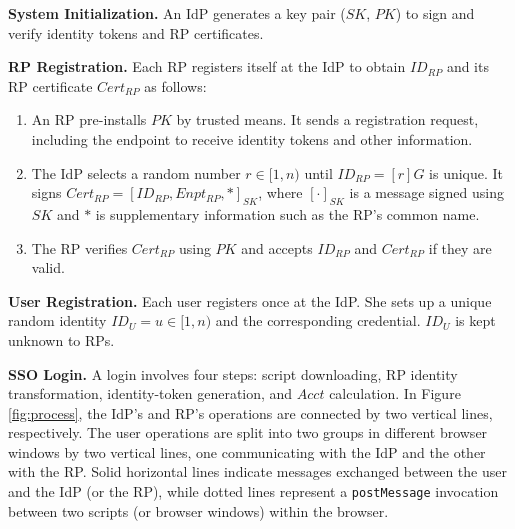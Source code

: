 \noindent \textbf{System Initialization.}
An IdP generates a key pair ($SK$, $PK$) to sign and verify identity tokens and RP certificates.

\vspace{1.5mm}
\noindent\textbf{RP Registration.}
Each RP registers itself at the IdP to obtain $ID_{RP}$ and its RP certificate $Cert_{RP}$ as follows:
\vspace{-\topsep}\begin{enumerate}
\setlength{\topsep}{0pt}
\setlength{\partopsep}{0pt}
\setlength{\itemsep}{0pt}
\setlength{\parsep}{0pt}
\setlength{\parskip}{0pt}
\item
An RP pre-installs $PK$ by trusted means.
It sends a registration request, including the endpoint to receive identity tokens and other information.
\item
The IdP selects a random number $r \in [1,n)$ until $ID_{RP} = [r]G$ is unique.
It signs $Cert_{RP} = [ID_{RP}, Enpt_{RP}, *]_{SK}$,
     where $[\cdot]_{SK}$ is a message signed using $SK$ and $*$ is supplementary information such as the RP's common name.
\item
The RP verifies $Cert_{RP}$ using $PK$ and accepts $ID_{RP}$ and $Cert_{RP}$ if they are valid.
\end{enumerate}


\noindent\textbf{User Registration.}
Each user registers once at the IdP. She sets up a unique random identity $ID_U = u \in [1, n)$ and the corresponding credential. $ID_U$ is kept unknown to RPs.


\vspace{1.5mm}
\noindent\textbf{SSO Login.} A login %
involves four steps: script downloading, RP identity transformation, identity-token generation, and $Acct$ calculation. In Figure \ref{fig:process}, the IdP's and RP's operations are connected by two vertical lines, respectively. The user operations are split into two groups in different browser windows by two vertical lines, one communicating with the IdP and the other with the RP. Solid horizontal lines indicate messages exchanged between the user and the IdP (or the RP), while dotted lines represent a \verb+postMessage+ invocation between two scripts (or browser windows) within the browser.



